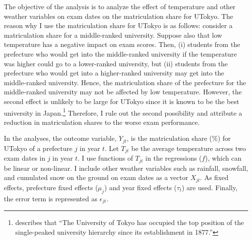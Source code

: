 \documentclass[12pt,letterpaper]{article}
\begin{document}
The objective of the analysis is to analyze the effect of temperature and other weather variables on exam dates on the matriculation share for UTokyo.
The reason why I use the matriculation share for UTokyo is as follows:
consider a matriculation share for a middle-ranked university.
Suppose also that low temperature has a negative impact on exam scores.
Then, 
(i) students from the prefecture who would get into the middle-ranked university if the temperature was higher could go to a lower-ranked university, but
(ii) students from the prefecture who would get into a higher-ranked university may get into the middle-ranked university.
Hence, the matriculation share of the prefecture for the middle-ranked university may not be affected by low temperature.
However, the second effect is unlikely to be large for UTokyo since it is known to be the best university in Japan.\footnote{
  \citet{Kawaguchi2008} describes that ``The University of Tokyo has occupied the top position of the single-peaked university hierarchy since its establishment in 1877.''
}
Therefore, I rule out the second possibility and attribute a reduction in matriculation shares to the worse exam performance.

In the analyses, the outcome variable, $Y_{jt}$, is the matriculation share (\%) for UTokyo of a prefecture $j$ in year $t$.
Let $T_{jt}$ be the average temperature across two exam dates in $j$ in year $t$.
I use functions of $T_{jt}$ in the regressions ($f$), which can be linear or non-linear.
I include other weather variables such as rainfall, snowfall, and cumulated snow on the ground on exam dates as a vector $X_{jt}$.
As fixed effects, prefecture fixed effects ($\mu_j$) and year fixed effects ($\tau_t$) are used.
Finally, the error term is represented as $\epsilon_{jt}$.
\end{document}
